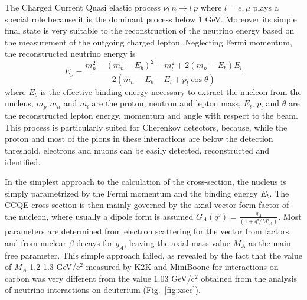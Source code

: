 The Charged Current Quasi elastic process $\nu_l \: n \rightarrow l \: p$ where $l=e,\mu$ plays a special role because it is the dominant process below 1 GeV. Moreover its simple final state is very suitable to the reconstruction of the neutrino energy based on the measurement of the outgoing charged lepton. Neglecting Fermi momentum, the reconstructed neutrino energy is 
\begin{equation}
E_\nu = \frac{m_p^2 - (m_n-E_b)^2 - m^2_l + 2 (m_n-E_b)E_l}{2 (m_n - E_b - E_l + p_l \cos \theta)}
\end{equation}
 where $E_b$ is the effective binding energy necessary to extract the nucleon from the nucleus, $m_p$ $m_n$ and $m_l$  are the proton, neutron and lepton mass, $E_l$, $p_l$ and $\theta$ are the reconstructed lepton energy, momentum and angle with respect to the beam. This process is particularly suited for Cherenkov detectors, because, while the proton and most of the pions in these interactions are below the detection threshold, electrons and muons can be easily detected, reconstructed and identified. 

In the simplest approach to the calculation of the cross-section, the nucleus is simply parametrized by the Fermi momentum and the binding energy $E_b$. The CCQE cross-section is then mainly governed by the axial vector form factor of the nucleon, where usually a dipole form is assumed
$ G_A (q²) = \frac {g_A} {(1+q²/M²_A)}$.
Most parameters are determined from electron scattering for the vector from factors, and from nuclear $\beta$ decays for $g_A$, leaving the axial mass value $M_A$ as the main free parameter. This simple approach failed, as revealed by the fact that the value of $M_A$ 1.2-1.3 GeV/c$^2$ measured by K2K and  MiniBoone for interactions on carbon was very different from the value 1.03 GeV/c$^2$ obtained from the analysis of neutrino interactions on deuterium (Fig.~\ref{fig:xsec}).

